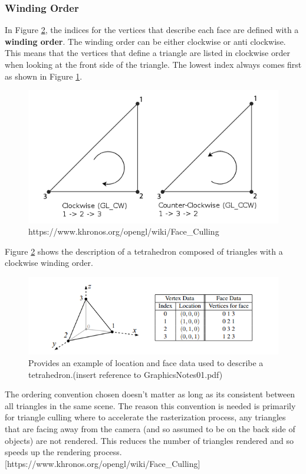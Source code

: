 \subsubsection{Winding Order}
In Figure \ref{fig:tetrahedron_description}, the indices for the vertices that describe each face are defined with a \textbf{winding order}. The winding order can be either clockwise or anti clockwise. This means that the vertices that define a triangle are listed in clockwise order when looking at the front side of the triangle. The lowest index always comes first as shown in Figure \ref{fig:triangle_winding_order}.
\begin{figure}[ht]
    \centering
    \includegraphics{lit_review/images/triangle_winding_order.png}
    \caption{https://www.khronos.org/opengl/wiki/Face\_Culling}
    \label{fig:triangle_winding_order}
\end{figure}
Figure \ref{fig:tetrahedron_description} shows the description of a tetrahedron composed of triangles with a clockwise winding order.
\begin{figure}[ht]
    \centering
    \includegraphics{lit_review/images/tetrahedron_description.png}
    \caption{Provides an example of location and face data used to describe a tetrahedron.(insert reference to GraphicsNotes01.pdf)}
    \label{fig:tetrahedron_description}
\end{figure}

The ordering convention chosen doesn't matter as long as its consistent between all triangles in the same scene. The reason this convention is needed is primarily for triangle culling where to accelerate the rasterization process, any triangles that are facing away from the camera (and so assumed to be on the back side of objects) are not rendered. This reduces the number of triangles rendered and so speeds up the rendering process. [https://www.khronos.org/opengl/wiki/Face\_Culling]

